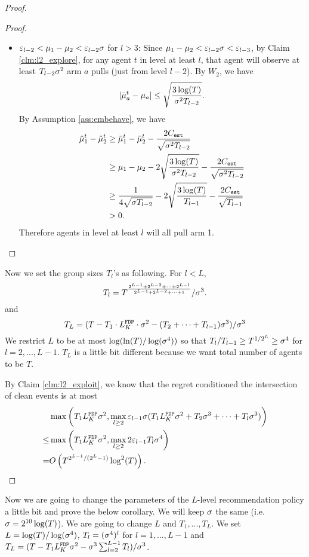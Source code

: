 \begin{proof}
\begin{proof}
\begin{itemize}
\item $\varepsilon_{l-2} < \mu_1 - \mu_2 < \varepsilon_{l-2}\sigma$ for $l >3$: Since $\mu_1-\mu_2 < \varepsilon_{l-2}\sigma < \varepsilon_{l-3}$, by Claim \ref{clm:l2_explore}, for any agent $t$ in level at least $l$, that agent will observe at least $T_{l-2}\sigma^2$ arm $a$ pulls (just from level $l-2$). By $W_2$, we have
\[
|\bar{\mu}_a^t - \mu_a| \leq \sqrt{\frac{3\log(T)}{\sigma^2T_{l-2}}}.
\]
By Assumption \ref{ass:embehave}, we have
\begin{align*}
\hat{\mu}_1^t - \hat{\mu}_2^t &\geq \bar{\mu}_1^t - \bar{\mu}_2^t - \frac{2C_{\mathtt{est}}}{\sqrt{\sigma^2T_{l-2}}} \\
&\geq \mu_1 -\mu_2 - 2 \sqrt{\frac{3\log(T)}{\sigma^2T_{l-2}}}- \frac{2C_{\mathtt{est}}}{\sqrt{\sigma^2T_{l-2}}} \\
&\geq\frac{1}{4\sqrt{\sigma T_{l-2}}} -  2 \sqrt{\frac{3\log(T)}{T_{l-1}}}- \frac{2C_{\mathtt{est}}}{\sqrt{T_{l-1}}} \\
&>0.
\end{align*}
Therefore agents in level at least $l$ will all pull arm 1. 
\end{itemize}
\end{proof}

Now we set the group sizes $T_l$'s as following. For $l < L$,
\[
T_l = T^{\frac{2^{L-1} + 2^{L-2} + \cdots + 2^{L-l}}{2^{L-1}+ 2^{L-2} + \cdots + 1}}/\sigma^3.
\]
and 
\[
T_L = (T - T_1 \cdot L^\mathtt{FDP}_K\cdot \sigma^2 - (T_2 + \cdots + T_{l-1}) \sigma^3) /\sigma^3
\]
We restrict $L$ to be at most $\log(\ln(T)/\log(\sigma^4))$ so that $T_l / T_{l-1} \geq T^{1/2^L} \geq \sigma^4$ for $l = 2,...,L-1$. $T_L$ is a little bit different because we want total number of agents to be $T$. 

By Claim \ref{clm:l2_exploit}, we know that the regret conditioned the intersection of clean events is at most 
\begin{align*}
&\max\left( T_1L^\mathtt{FDP}_K \sigma^2 , \max_{l \geq 2} \varepsilon_{l-1}\sigma(T_1L^\mathtt{FDP}_K \sigma^2 + T_2 \sigma^3 + \cdots + T_l\sigma^3)\right) \\
\leq & \max\left( T_1L^\mathtt{FDP}_K \sigma^2 , \max_{l \geq 2} 2 \varepsilon_{l-1} T_l \sigma^4 \right)\\
= &O\left(T^{2^{L-1}/(2^L-1)} \log^2(T) \right).
\end{align*}
\end{proof}

Now we are going to change the parameters of the $L$-level recommendation policy a little bit and prove the below corollary. We will keep $\sigma$ the same (i.e. $\sigma = 2^{10}\log(T)$). We are going to change $L$ and $T_1,...,T_L$. We set $L = \log(T)/\log(\sigma^4)$, $T_l = (\sigma^4)^l$ for $l=1,...,L-1$ and $T_L = (T - T_1 L^\mathtt{FDP}_K \sigma^2 - \sigma^3\sum_{l=2}^{L-1} T_l)/\sigma^3$.  

